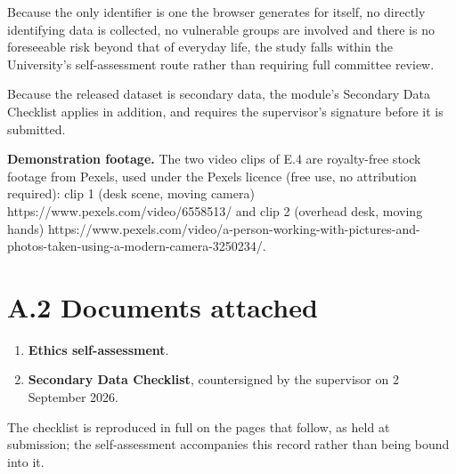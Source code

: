 Because the only identifier is one the browser generates for itself, no directly identifying data is collected, no vulnerable groups are involved and there is no foreseeable risk beyond that of everyday life, the study falls within the University's self-assessment route rather than requiring full committee review.

Because the released dataset is secondary data, the module's Secondary Data Checklist applies in addition, and requires the supervisor's signature before it is submitted.

\textbf{Demonstration footage.} The two video clips of E.4 are royalty-free stock footage from Pexels, used under the Pexels licence (free use, no attribution required): clip 1 (desk scene, moving camera) https:/\allowbreak{}/\allowbreak{}www.\allowbreak{}pexels.\allowbreak{}com/\allowbreak{}video/\allowbreak{}6558513/\allowbreak{} and clip 2 (overhead desk, moving hands) https:/\allowbreak{}/\allowbreak{}www.\allowbreak{}pexels.\allowbreak{}com/\allowbreak{}video/\allowbreak{}a-\allowbreak{}person-\allowbreak{}working-\allowbreak{}with-\allowbreak{}pictures-\allowbreak{}and-\allowbreak{}photos-\allowbreak{}taken-\allowbreak{}using-\allowbreak{}a-\allowbreak{}modern-\allowbreak{}camera-\allowbreak{}3250234/\allowbreak{}.\allowbreak{}

\section{A.2 Documents attached}

\begin{enumerate}
\item \textbf{Ethics self-assessment}.
\item \textbf{Secondary Data Checklist}, countersigned by the supervisor on 2 September 2026.
\end{enumerate}

The checklist is reproduced in full on the pages that follow, as held at submission; the self-assessment accompanies this record rather than being bound into it.